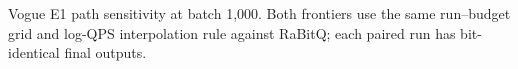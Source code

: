 \begin{table}[tbp]
\centering
\caption[Vogue E1 scan-path sensitivity]{Vogue E1 path sensitivity at batch 1,000. Both frontiers use
the same run--budget grid and log-QPS interpolation rule against RaBitQ;
each paired run has bit-identical final outputs.}
\label{tab:7-e1-paths}
\small\setlength{\tabcolsep}{5pt}

\end{table}
